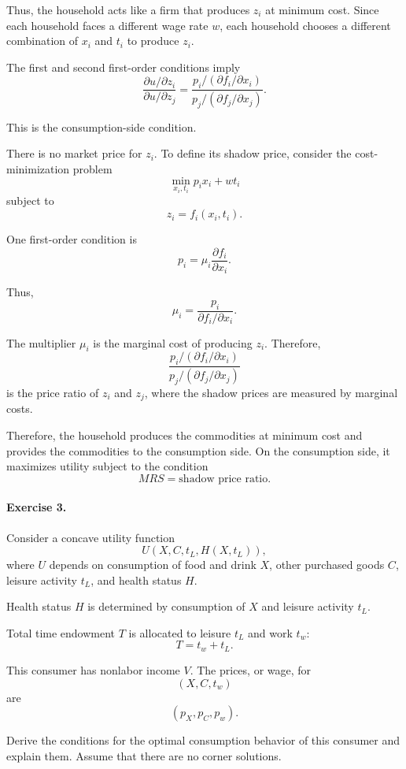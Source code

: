 Thus, the household acts like a firm that produces \(z_i\) at minimum cost. Since each household faces a different wage rate \(w\), each household chooses a different combination of \(x_i\) and \(t_i\) to produce \(z_i\).

The first and second first-order conditions imply
\[
\frac{
\partial u/\partial z_i
}{
\partial u/\partial z_j
}
=
\frac{
p_i/(\partial f_i/\partial x_i)
}{
p_j/(\partial f_j/\partial x_j)
}.
\]

This is the consumption-side condition.

There is no market price for \(z_i\). To define its shadow price, consider the cost-minimization problem
\[
\min_{x_i,t_i} p_i x_i+wt_i
\]
subject to
\[
z_i=f_i(x_i,t_i).
\]

One first-order condition is
\[
p_i
=
\mu_i
\frac{\partial f_i}{\partial x_i}.
\]

Thus,
\[
\mu_i
=
\frac{p_i}{\partial f_i/\partial x_i}.
\]

The multiplier \(\mu_i\) is the marginal cost of producing \(z_i\). Therefore,
\[
\frac{
p_i/(\partial f_i/\partial x_i)
}{
p_j/(\partial f_j/\partial x_j)
}
\]
is the price ratio of \(z_i\) and \(z_j\), where the shadow prices are measured by marginal costs.

Therefore, the household produces the commodities at minimum cost and provides the commodities to the consumption side. On the consumption side, it maximizes utility subject to the condition
\[
MRS=\text{shadow price ratio}.
\]

\paragraph{Exercise 3.}
Consider a concave utility function
\[
U(X,C,t_L,H(X,t_L)),
\]
where \(U\) depends on consumption of food and drink \(X\), other purchased goods \(C\), leisure activity \(t_L\), and health status \(H\).

Health status \(H\) is determined by consumption of \(X\) and leisure activity \(t_L\).

Total time endowment \(T\) is allocated to leisure \(t_L\) and work \(t_w\):
\[
T=t_w+t_L.
\]

This consumer has nonlabor income \(V\). The prices, or wage, for
\[
(X,C,t_w)
\]
are
\[
(p_X,p_C,p_w).
\]

Derive the conditions for the optimal consumption behavior of this consumer and explain them. Assume that there are no corner solutions.

